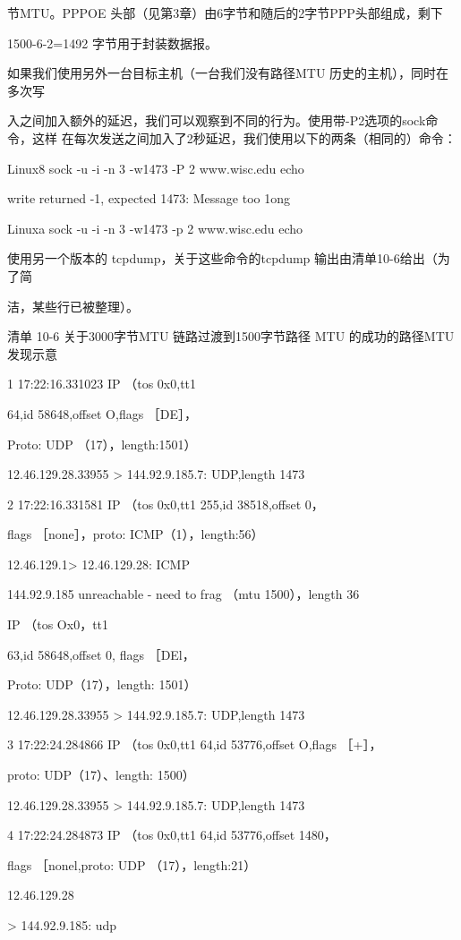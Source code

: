 节MTU。PPPOE 头部（见第3章）由6字节和随后的2字节PPP头部组成，剩下

1500-6-2=1492 字节用于封装数据报。

如果我们使用另外一台目标主机（一台我们没有路径MTU 历史的主机），同时在多次写

入之间加入额外的延迟，我们可以观察到不同的行为。使用带-P2选项的sock命令，这样
在每次发送之间加入了2秒延迟，我们使用以下的两条（相同的）命令：

Linux8 sock -u -i -n 3 -w1473 -P 2 www.wisc.edu echo

write returned -1, expected 1473: Message too 1ong

Linuxa sock -u -i -n 3 -w1473 -p 2 www.wisc.edu echo

使用另一个版本的 tcpdump，关于这些命令的tcpdump 输出由清单10-6给出（为了简

洁，某些行已被整理）。

清单 10-6 关于3000字节MTU 链路过渡到1500字节路径 MTU 的成功的路径MTU 发现示意

1 17:22:16.331023 IP （tos 0x0,tt1

64,id 58648,offset O,flags ［DE］，

Proto: UDP （17），length:1501）

12.46.129.28.33955 > 144.92.9.185.7: UDP,length 1473

2 17:22:16.331581 IP （tos 0x0,tt1 255,id 38518,offset 0，

flags ［none］，proto: ICMP（1），length:56）

12.46.129.1> 12.46.129.28: ICMP

144.92.9.185 unreachable - need to frag （mtu 1500），length 36

IP （tos Ox0，tt1

63,id 58648,offset 0, flags ［DEl，

Proto: UDP（17），length: 1501）

12.46.129.28.33955 > 144.92.9.185.7: UDP,length 1473

3 17:22:24.284866 IP （tos 0x0,tt1 64,id 53776,offset O,flags ［+］，

proto: UDP（17）、length: 1500）

12.46.129.28.33955 > 144.92.9.185.7: UDP,length 1473

4 17:22:24.284873 IP （tos 0x0,tt1 64,id 53776,offset 1480，

flags ［nonel,proto: UDP （17），length:21）

12.46.129.28

> 144.92.9.185: udp

